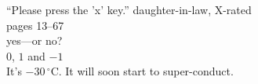 \documentclass{article}
\begin{document}
   ``Please press the 'x' key.''
daughter-in-law, X-rated\\
pages 13--67\\
yes---or no?\\
$0$, $1$ and $-1$\\
It's $-30\,^{\circ}\mathrm{C}$.
It will soon start to super-conduct.
\end{document}
